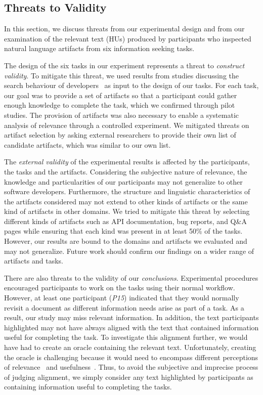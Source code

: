 
\subsection{Threats to Validity}
\label{cp3:threats}


In this section, we discuss threats from our experimental design 
and from our
examination of the relevant text (HUs) produced by participants who 
inspected natural language artifacts from six information seeking tasks. 



The design of the six tasks in our experiment represents a threat to
\textit{construct validity}.  To mitigate this threat, we used results from studies discussing the search
behaviour of developers~\cite{umarji2008archetypal, Li2013, Xia2017} as
input to the design of our tasks.
For each task, our goal was to provide a set of artifacts so that a
participant could gather enough knowledge to complete the task, which
we confirmed through pilot studies.  The provision of artifacts was also
necessary to enable a systematic analysis of relevance through a
controlled experiment. We mitigated threats on artifact
selection by asking external researchers to provide their own list of
candidate artifacts, which was similar to our own list.



The \textit{external validity} of the experimental results is affected
by the participants, the tasks and the artifacts.  Considering the
subjective nature of relevance, the knowledge and particularities of
our participants may not generalize to other software developers.
Furthermore, the structure and linguistic characteristics of the
artifacts considered may not extend to other kinds of artifacts or the
same kind of artifacts in other domains.  We tried to mitigate this
threat by selecting different kinds of artifacts such as API
documentation, bug reports, and Q\&A pages while 
ensuring that each kind was present in at least
50\% of the tasks. 
However, our results
are bound to the domains and artifacts we evaluated and may not generalize.
Future work should confirm our findings on a wider range of artifacts and tasks.


There are also threats to the validity of our
\textit{conclusions}.
Experimental procedures encouraged participants to work on the tasks using their normal workflow.
However, at least one participant (\textit{P15}) indicated that they would normally
revisit a document as different information needs arise as part of a task.
As a result, our study may miss relevant information.
In addition, the text participants highlighted may not have always aligned with the text that contained information useful for completing the task.
To investigate this alignment further, we would have had to create an oracle containing the relevant text.
Unfortunately, creating the oracle is challenging because it would need to encompass different perceptions of relevance~\cite{Pirolli1999,saracevic1975,Nenkova2004} and usefulness~\cite{Freund2013, Freund2015}.
Thus, to avoid the subjective and imprecise process of judging alignment, we simply consider any text highlighted by participants as containing information useful to completing the tasks.



